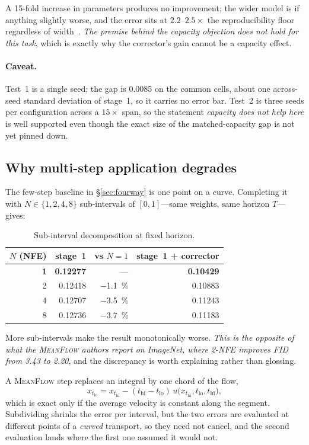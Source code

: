 ﻿\documentclass[11pt,a4paper]{article}
\newcommand{\mf}{\textsc{MeanFlow}}
\newcommand{\strong}{\textcolor{green!35!black}{\textbullet\!\textbullet\!\textbullet}}
\begin{document}
A 15-fold increase in parameters produces no improvement; the wider model is if anything
slightly worse, and the error sits at $2.2$--$2.5\times$ the reproducibility floor regardless of
width~\strong. \emph{The premise behind the capacity objection does not hold for this task},
which is exactly why the corrector's gain cannot be a capacity effect.

\paragraph{Caveat.} Test~1 is a single seed; the gap is 0.0085 on the common cells, about one
across-seed standard deviation of stage~1, so it carries no error bar. Test~2 is three seeds per
configuration across a $15\times$ span, so the statement \emph{capacity does not help here} is
well supported even though the exact size of the matched-capacity gap is not yet pinned down.

\subsection{Why multi-step application degrades}

The few-step baseline in \S\ref{sec:fourway} is one point on a curve. Completing it with
$N\in\{1,2,4,8\}$ sub-intervals of $[0,1]$---same weights, same horizon $T$---gives:

\begin{table}[h]
\centering\small
\begin{tabular}{@{}rrrr@{}}
\toprule
$N$ (NFE) & stage~1 & vs $N{=}1$ & stage~1 + corrector \\
\midrule
\textbf{1} & \textbf{0.12277} & --- & \textbf{0.10429} \\
2 & 0.12418 & \SI{-1.1}{\percent} & 0.10883 \\
4 & 0.12707 & \SI{-3.5}{\percent} & 0.11243 \\
8 & 0.12736 & \SI{-3.7}{\percent} & 0.11183 \\
\bottomrule
\end{tabular}
\caption{Sub-interval decomposition at fixed horizon.}
\end{table}

More sub-intervals make the result monotonically worse. \emph{This is the opposite of what the
\mf{} authors report on ImageNet, where 2-NFE improves FID from 3.43 to 2.20}, and the
discrepancy is worth explaining rather than glossing.

A \mf{} step replaces an integral by one chord of the flow,
\begin{equation}
x_{t_{\text{lo}}}=x_{t_{\text{hi}}}-(t_{\text{hi}}-t_{\text{lo}})\,
u\big(x_{t_{\text{hi}}},t_{\text{lo}},t_{\text{hi}}\big),
\end{equation}
which is exact only if the average velocity is constant along the segment. Subdividing shrinks
the error per interval, but the two errors are evaluated at different points of a \emph{curved}
transport, so they need not cancel, and the second evaluation lands where the first one assumed
it would not.
\end{document}
